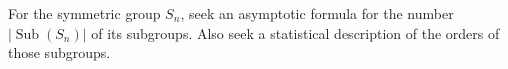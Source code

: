For the symmetric group $S_n$, seek an asymptotic formula for the number $|\operatorname{Sub}(S_n)|$ of its subgroups. Also seek a statistical description of the orders of those subgroups.
